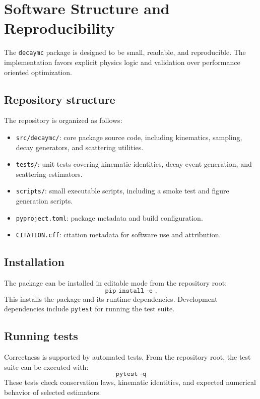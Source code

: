 \documentclass[11pt,a4paper]{article}
\begin{document}
\section{Software Structure and Reproducibility}
\label{sec:software}

The \texttt{decaymc} package is designed to be small, readable, and reproducible. The
implementation favors explicit physics logic and validation over performance oriented
optimization.

\subsection{Repository structure}

The repository is organized as follows:
\begin{itemize}
  \item \texttt{src/decaymc/}: core package source code, including kinematics, sampling,
  decay generators, and scattering utilities.
  \item \texttt{tests/}: unit tests covering kinematic identities, decay event generation,
  and scattering estimators.
  \item \texttt{scripts/}: small executable scripts, including a smoke test and figure
  generation scripts.
  \item \texttt{pyproject.toml}: package metadata and build configuration.
  \item \texttt{CITATION.cff}: citation metadata for software use and attribution.
\end{itemize}

\subsection{Installation}

The package can be installed in editable mode from the repository root:
\begin{equation}
\texttt{pip install -e .}
\end{equation}
This installs the package and its runtime dependencies. Development dependencies include
\texttt{pytest} for running the test suite.

\subsection{Running tests}

Correctness is supported by automated tests. From the repository root, the test suite can
be executed with:
\begin{equation}
\texttt{pytest -q}
\end{equation}
These tests check conservation laws, kinematic identities, and expected numerical behavior
of selected estimators.
\end{document}
